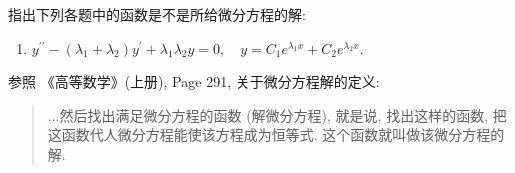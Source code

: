 \documentclass[answer]{THUExam}
\begin{document}
\begin{problem}
指出下列各题中的函数是不是所给微分方程的解:
\begin{enumerate}
    \item $y^{\prime \prime}-\left(\lambda_1+\lambda_2\right) y^{\prime}+\lambda_1 \lambda_2 y=0,\quad y=C_1 e^{\lambda_1 x}+C_2 e^{\lambda_2 x}$.
\end{enumerate}
\end{problem}
\bigskip
\begin{note}
    参照 《高等数学》(上册), Page 291, 关于微分方程解的定义:
    \begin{quote}
        ...然后找出满足微分方程的函数 (解微分方程), 就是说, 找出这样的函数, 把这函数代人微分方程能使该方程成为恒等式. 这个函数就叫做该微分方程的解.
    \end{quote}
\end{note}
\end{document}
